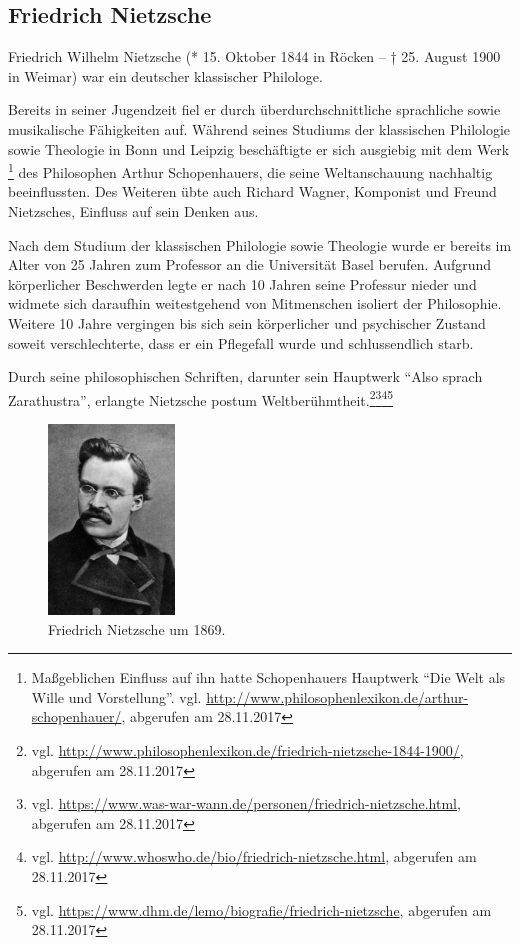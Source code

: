 \subsection{Friedrich Nietzsche}

Friedrich Wilhelm Nietzsche (* 15. Oktober 1844 in Röcken – † 25. August 1900 in Weimar) war ein deutscher klassischer Philologe.

Bereits in seiner Jugendzeit fiel er durch überdurchschnittliche sprachliche sowie musikalische Fähigkeiten auf.
Während seines Studiums der klassischen Philologie sowie Theologie in Bonn und Leipzig beschäftigte er sich ausgiebig mit dem Werk
\footnote{Maßgeblichen Einfluss auf ihn hatte Schopenhauers Hauptwerk \enquote{Die Welt als Wille und Vorstellung}. vgl. \url{http://www.philosophenlexikon.de/arthur-schopenhauer/}, abgerufen am 28.11.2017}
des Philosophen Arthur Schopenhauers, die seine Weltanschauung nachhaltig beeinflussten.
Des Weiteren übte auch Richard Wagner, Komponist und Freund Nietzsches, Einfluss auf sein Denken aus.

Nach dem Studium der klassischen Philologie sowie Theologie wurde er bereits im Alter von 25 Jahren zum Professor an die Universität Basel berufen.
Aufgrund körperlicher Beschwerden legte er nach 10 Jahren seine Professur nieder und widmete sich daraufhin weitestgehend von Mitmenschen isoliert der Philosophie.
Weitere 10 Jahre vergingen bis sich sein körperlicher und psychischer Zustand soweit verschlechterte, dass er ein Pflegefall wurde und schlussendlich starb.

Durch seine philosophischen Schriften, darunter sein Hauptwerk \enquote{Also sprach Zarathustra}, erlangte Nietzsche postum Weltberühmtheit.\footnote{vgl. \url{http://www.philosophenlexikon.de/friedrich-nietzsche-1844-1900/}, abgerufen am 28.11.2017}\footnote{vgl. \url{https://www.was-war-wann.de/personen/friedrich-nietzsche.html}, abgerufen am 28.11.2017}\footnote{vgl. \url{http://www.whoswho.de/bio/friedrich-nietzsche.html}, abgerufen am 28.11.2017}\footnote{vgl. \url{https://www.dhm.de/lemo/biografie/friedrich-nietzsche}, abgerufen am 28.11.2017}

\begin{figure}[H]
\centering 
 \includegraphics[width=0.3\textwidth]{Bilder/kap3/nietzschePortrait} 
 \caption{Friedrich Nietzsche um 1869.\cite{WQ14}  \label{portraitNietzsche}}
\end{figure}


